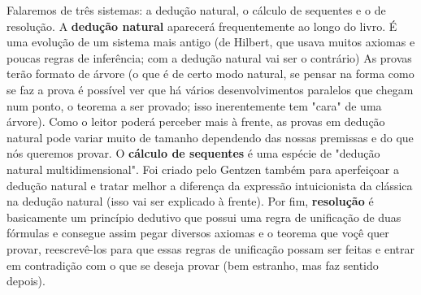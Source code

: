 Falaremos de três sistemas: a dedução natural, o cálculo de sequentes e o de resolução. A \textbf{dedução natural} aparecerá frequentemente ao longo do livro. É uma evolução de um sistema mais antigo (de Hilbert, que usava muitos axiomas e poucas regras de inferência; com a dedução natural vai ser o contrário) As provas terão formato de árvore (o que é de certo modo natural, se pensar na forma como se faz a prova é possível ver que há vários desenvolvimentos paralelos que chegam num ponto, o teorema a ser provado; isso inerentemente tem "cara" de uma árvore). Como o leitor poderá perceber mais à frente, as provas em dedução natural pode variar muito de tamanho dependendo das nossas premissas e do que nós queremos provar.
O \textbf{cálculo de sequentes} é uma espécie de "dedução natural multidimensional". Foi criado pelo Gentzen também para aperfeiçoar a dedução natural e tratar melhor a diferença da expressão intuicionista da clássica na dedução natural (isso vai ser explicado à frente). 
Por fim, \textbf{resolução} é basicamente um princípio dedutivo que possui uma regra de unificação de duas fórmulas e consegue assim pegar diversos axiomas e o teorema que voçê quer provar, reescrevê-los para que essas regras de unificação possam ser feitas e entrar em contradição com o que se deseja provar (bem estranho, mas faz sentido depois).







